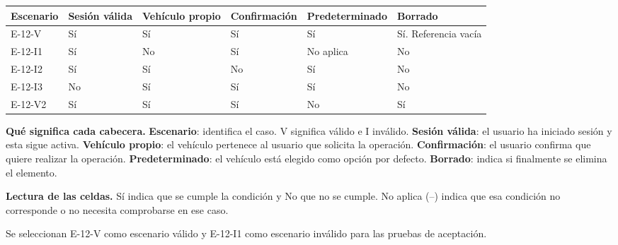 \begingroup\fontsize{7.8}{11}\selectfont\setlength{\tabcolsep}{3pt}
\begin{tabularx}{\linewidth}{@{}*{6}{Y}@{}}\toprule
\textbf{Escenario} & \textbf{Sesión válida} & \textbf{Vehículo propio} & \textbf{Confirmación} & \textbf{Predeterminado} & \textbf{Borrado}\\\midrule
E-12-V & Sí & Sí & Sí & Sí & Sí. Referencia vacía\\[3pt]
E-12-I1 & Sí & No & Sí & No aplica & No\\[3pt]
E-12-I2 & Sí & Sí & No & Sí & No\\[3pt]
E-12-I3 & No & Sí & Sí & Sí & No\\[3pt]
E-12-V2 & Sí & Sí & Sí & No & Sí\\[3pt]
\bottomrule\end{tabularx}\endgroup\par
{\fontsize{9}{11}\selectfont\textbf{Qué significa cada cabecera.} \textbf{Escenario}: identifica el caso. V significa válido e I inválido. \textbf{Sesión válida}: el usuario ha iniciado sesión y esta sigue activa. \textbf{Vehículo propio}: el vehículo pertenece al usuario que solicita la operación. \textbf{Confirmación}: el usuario confirma que quiere realizar la operación. \textbf{Predeterminado}: el vehículo está elegido como opción por defecto. \textbf{Borrado}: indica si finalmente se elimina el elemento.\par\textbf{Lectura de las celdas.} Sí indica que se cumple la condición y No que no se cumple. No aplica (--) indica que esa condición no corresponde o no necesita comprobarse en ese caso.\par}


Se seleccionan E-12-V como escenario válido y E-12-I1 como escenario inválido para las pruebas de aceptación.\par


